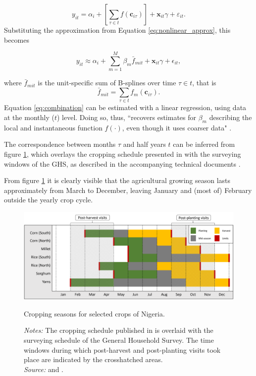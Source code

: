 \documentclass[a4paper,12pt]{article}
\theoremstyle{plain}
\theoremstyle{definition}
\theoremstyle{definition}
\theoremstyle{definition}
\theoremstyle{definition}
\begin{document}
\begin{equation}
    y_{it}=\alpha_i+\left[\sum_{\tau\in t}f(\mathbf{c}_{i\tau})\right] + \mathbf{x}_{it}\gamma + \varepsilon_{it}.
\end{equation}
Substituting the approximation from Equation \ref{eq:nonlinear_approx}, this becomes

\begin{equation}
    \label{eq:combination}
    y_{it}\approx\alpha_i + \sum_{m=1}^M \beta_m \bar{f}_{mit} + \mathbf{x}_{it}\gamma + \epsilon_{it},
\end{equation}

where $\bar{f}_{mit}$ is the unit-specific sum of B-splines over time $\tau \in t$, that is 
\begin{equation}
    \label{eq:bspline}
    \bar{f}_{mit} = \sum_{\tau\in t} f_m(\mathbf{c}_{i\tau}).
\end{equation}
Equation \ref{eq:combination} can be estimated with a linear regression, using data at the monthly ($t$) level. Doing so, thus, ``recovers estimates for $\beta_m$ describing the local and instantaneous function $f(\cdot)$, even though it uses coarser data" \citep[][p. 19]{Hsiang2016a}.

The correspondence between months $\tau$ and half years $t$ can be inferred from figure \ref{fig:growingseason}, which overlays the cropping schedule presented in \citet{shiru2019} with the surveying windows of the GHS, as described in the accompanying technical documents \citep{NBS2020}.

From figure \ref{fig:growingseason} it is clearly visible that the agricultural growing season lasts approximately from March to December, leaving January and (most of) February outside the yearly crop cycle.

\begin{figure}[h]
    \centering
    \includegraphics[scale=0.522]{../outputs/growing_season.PNG}
    \caption{Cropping seasons for selected crops of Nigeria.}
    \caption*{\footnotesize{\textit{Notes:} The cropping schedule published in \citet[][p. 62]{shiru2019} is overlaid with the surveying schedule of the General Household Survey. The time windows during which post-harvest and post-planting visits took place are indicated by the crosshatched areas.\\ \textit{Source:} \citet[][p. 62]{shiru2019} and \citet{NBS2020}.}}
    \label{fig:growingseason}
\end{figure}
\end{document}
